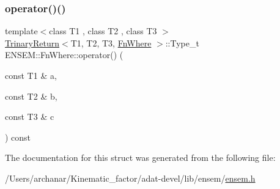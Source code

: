 \subsubsection{\texorpdfstring{operator()()}{operator()()}\hspace{0.1cm}{\footnotesize\ttfamily [3/3]}}
{\footnotesize\ttfamily template$<$class T1 , class T2 , class T3 $>$ \\
\mbox{\hyperlink{structENSEM_1_1TrinaryReturn}{Trinary\+Return}}$<$T1, T2, T3, \mbox{\hyperlink{structENSEM_1_1FnWhere}{Fn\+Where}} $>$\+::Type\+\_\+t E\+N\+S\+E\+M\+::\+Fn\+Where\+::operator() (\begin{DoxyParamCaption}\item[{const T1 \&}]{a,  }\item[{const T2 \&}]{b,  }\item[{const T3 \&}]{c }\end{DoxyParamCaption}) const\hspace{0.3cm}{\ttfamily [inline]}}



The documentation for this struct was generated from the following file\+:\begin{DoxyCompactItemize}
\item 
/\+Users/archanar/\+Kinematic\+\_\+factor/adat-\/devel/lib/ensem/\mbox{\hyperlink{adat-devel_2lib_2ensem_2ensem_8h}{ensem.\+h}}\end{DoxyCompactItemize}
